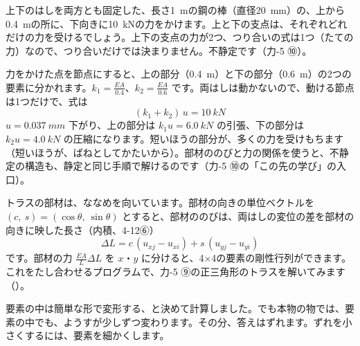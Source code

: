上下のはしを両方とも固定した、長さ\qty{1}{m}の鋼の棒（直径\qty{20}{mm}）の、上から\qty{0.4}{m}の所に、下向きに\qty{10}{kN}の力をかけます。上と下の支点は、それぞれどれだけの力を受けるでしょう。上下の支点の力が2つ、つり合いの式は1つ（たての力）なので、つり合いだけでは決まりません。不静定です（力-5 ⑩）。

力をかけた点を節点にすると、上の部分（\qty{0.4}{m}）と下の部分（\qty{0.6}{m}）の2つの要素に分かれます。$k_1=\tfrac{EA}{0.4}$、$k_2=\tfrac{EA}{0.6}$ です。両はしは動かないので、動ける節点は1つだけで、式は
\[(k_1+k_2)\,u=\qty{10}{kN}\]
$u=\qty{0.037}{mm}$ 下がり、上の部分は $k_1u=\qty{6.0}{kN}$ の引張、下の部分は $k_2u=\qty{4.0}{kN}$ の圧縮になります。短いほうの部分が、多くの力を受けもちます（短いほうが、ばねとしてかたいから）。部材ののびと力の関係を使うと、不静定の構造も、静定と同じ手順で解けるのです（力-5 ⑩の「この先の学び」の入口）。

トラスの部材は、ななめを向いています。部材の向きの単位ベクトルを $(c,\ s)=(\cos\theta,\ \sin\theta)$ とすると、部材ののびは、両はしの変位の差を部材の向きに映した長さ（内積、\mbox{4-12⑥}）
\[\Delta L=c\,(u_{xj}-u_{xi})+s\,(u_{yj}-u_{yi})\]
です。部材の力 $\tfrac{EA}{L}\Delta L$ を $x$・$y$ に分けると、4×4の要素の剛性行列ができます。これをたし合わせるプログラムで、力-5 ⑨の正三角形のトラスを解いてみます（）。

\leavevmode\label{ph:力-16:sec5}要素の中は簡単な形で変形する、と決めて計算しました。でも本物の物では、要素の中でも、ようすが少しずつ変わります。その分、答えはずれます。ずれを小さくするには、要素を細かくします。


